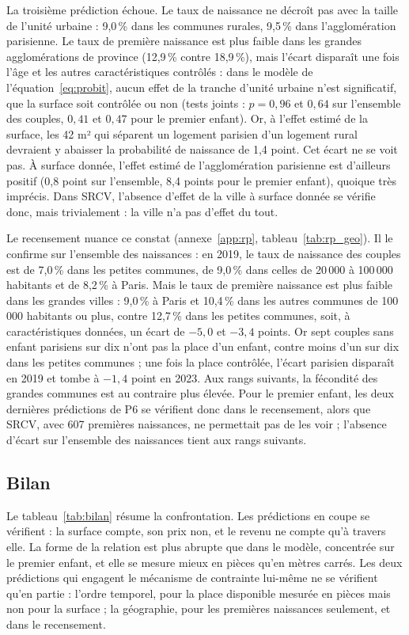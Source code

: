 \documentclass[11pt,a4paper]{article}
\theoremstyle{plain}
\theoremstyle{definition}
\theoremstyle{remark}
\begin{document}
La troisième prédiction échoue. Le taux de naissance ne décroît pas avec la taille de l'unité urbaine : 9,0\,\% dans les communes rurales, 9,5\,\% dans l'agglomération parisienne. Le taux de première naissance est plus faible dans les grandes agglomérations de province (12,9\,\% contre 18,9\,\%), mais l'écart disparaît une fois l'âge et les autres caractéristiques contrôlés : dans le modèle de l'équation~\eqref{eq:probit}, aucun effet de la tranche d'unité urbaine n'est significatif, que la surface soit contrôlée ou non (tests joints : $p = 0{,}96$ et $0{,}64$ sur l'ensemble des couples, $0{,}41$ et $0{,}47$ pour le premier enfant). Or, à l'effet estimé de la surface, les 42 m² qui séparent un logement parisien d'un logement rural devraient y abaisser la probabilité de naissance de 1,4 point. Cet écart ne se voit pas. À surface donnée, l'effet estimé de l'agglomération parisienne est d'ailleurs positif (0,8 point sur l'ensemble, 8,4 points pour le premier enfant), quoique très imprécis. Dans SRCV, l'absence d'effet de la ville à surface donnée se vérifie donc, mais trivialement : la ville n'a pas d'effet du tout.

Le recensement nuance ce constat (annexe~\ref{app:rp}, tableau~\ref{tab:rp_geo}). Il le confirme sur l'ensemble des naissances : en 2019, le taux de naissance des couples est de 7,0\,\% dans les petites communes, de 9,0\,\% dans celles de 20\,000 à 100\,000 habitants et de 8,2\,\% à Paris. Mais le taux de première naissance est plus faible dans les grandes villes : 9,0\,\% à Paris et 10,4\,\% dans les autres communes de 100\,000 habitants ou plus, contre 12,7\,\% dans les petites communes, soit, à caractéristiques données, un écart de $-5{,}0$ et $-3{,}4$ points. Or sept couples sans enfant parisiens sur dix n'ont pas la place d'un enfant, contre moins d'un sur dix dans les petites communes ; une fois la place contrôlée, l'écart parisien disparaît en 2019 et tombe à $-1{,}4$ point en 2023. Aux rangs suivants, la fécondité des grandes communes est au contraire plus élevée. Pour le premier enfant, les deux dernières prédictions de P6 se vérifient donc dans le recensement, alors que SRCV, avec 607 premières naissances, ne permettait pas de les voir ; l'absence d'écart sur l'ensemble des naissances tient aux rangs suivants.

\subsection{Bilan}

Le tableau~\ref{tab:bilan} résume la confrontation. Les prédictions en coupe se vérifient : la surface compte, son prix non, et le revenu ne compte qu'à travers elle. La forme de la relation est plus abrupte que dans le modèle, concentrée sur le premier enfant, et elle se mesure mieux en pièces qu'en mètres carrés. Les deux prédictions qui engagent le mécanisme de contrainte lui-même ne se vérifient qu'en partie : l'ordre temporel, pour la place disponible mesurée en pièces mais non pour la surface ; la géographie, pour les premières naissances seulement, et dans le recensement.
\end{document}
